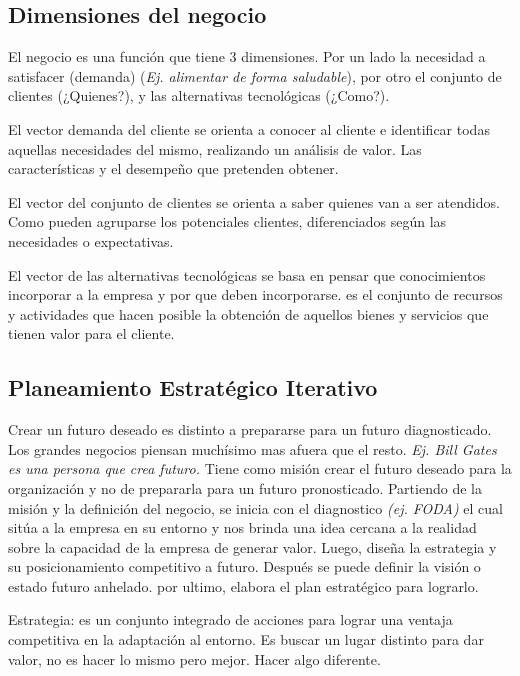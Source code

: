 \documentclass[titlepage,a4paper]{article}
\begin{document}
\subsection{Dimensiones del negocio}
El negocio es una función que tiene 3 dimensiones. Por un lado la necesidad a satisfacer (demanda) (\textit{Ej. alimentar de forma saludable}), por otro el conjunto de clientes (¿Quienes?), y las alternativas tecnológicas (¿Como?).

El vector demanda del cliente se orienta a conocer al cliente e identificar todas aquellas necesidades del mismo, realizando un análisis de valor. Las características y el desempeño que pretenden obtener.

El vector del conjunto de clientes se orienta a saber quienes van a ser atendidos. Como pueden agruparse los potenciales clientes, diferenciados según las necesidades o expectativas.

El vector de las alternativas tecnológicas se basa en pensar que conocimientos incorporar a la empresa y por que deben incorporarse. es el conjunto de recursos y actividades que hacen posible la obtención de aquellos bienes y servicios que tienen valor para el cliente.

\subsection{Planeamiento Estratégico Iterativo }
Crear un futuro deseado es distinto a prepararse para un futuro diagnosticado. Los grandes negocios piensan muchísimo mas afuera que el resto. \textit{Ej. Bill Gates es una persona que crea futuro.} Tiene como misión crear el futuro deseado para la organización y no de prepararla para un futuro pronosticado. Partiendo de la misión y la definición del negocio, se inicia con el diagnostico \textit{(ej. FODA)} el cual sitúa a la empresa en su entorno y nos brinda una idea cercana a la realidad sobre la capacidad de la empresa de generar valor. Luego, diseña la estrategia y su posicionamiento competitivo a futuro. Después se puede definir la visión o estado futuro anhelado. por ultimo, elabora el plan estratégico para lograrlo.

    \smallskip

Estrategia: es un conjunto integrado de acciones para lograr una ventaja competitiva en la adaptación al entorno. Es buscar un lugar distinto para dar valor, no es hacer lo mismo pero mejor. Hacer algo diferente.

    \smallskip
\end{document}
